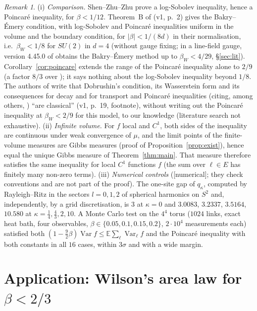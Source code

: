 \documentclass[11pt,a4paper]{article}
\theoremstyle{remark}
\newtheorem{remark}[theorem]{Remark}
\theoremstyle{definition}
\theoremstyle{plain}
\theoremstyle{remark}
\newcommand{\E}{\mathbb{E}}
\newcommand{\Var}{\operatorname{Var}}
\newcommand{\st}[1]{\textsf{[#1]}}
\begin{document}
\begin{remark}\label{rem:poincare}
(i) \emph{Comparison.} Shen--Zhu--Zhu \cite{SZZ23} prove a log-Sobolev inequality, hence a Poincar\'e inequality, for $\beta<1/12$. Theorem~B of \cite{BB26} (v1, p.~2) gives the Bakry--\'Emery
condition, with log-Sobolev and Poincar\'e inequalities uniform in the volume and the boundary condition, for $|\beta|<1/(8d)$ in their normalisation, i.e.\ $\beta_W<1/8$ for $SU(2)$ in $d=4$ (without gauge fixing; in a line-field gauge, version 4.45.0 of \cite{BB26e} obtains the Bakry--\'Emery method up to $\beta_W<4/29$, \S\ref{sec:lit}). Corollary~\ref{cor:poincare} extends the range of the
Poincar\'e inequality alone to $2/9$ (a factor $8/3$ over \cite{SZZ23}); it says nothing about the log-Sobolev inequality beyond $1/8$. The authors of \cite{BB26} write that Dobrushin's condition,
its Wasserstein form and its consequences for decay and for transport and Poincar\'e inequalities (citing, among others, \cite{Wu06}) ``are classical'' (v1, p.~19, footnote), without writing out the Poincar\'e inequality at $\beta_W<2/9$ for this model, to our
knowledge (literature search not exhaustive).
(ii) \emph{Infinite volume.} For $f$ local and $C^1$, both sides of the inequality are continuous under weak convergence of $\mu$, and the limit points of the finite-volume measures are Gibbs measures (proof of
Proposition~\ref{prop:exist}), hence equal the unique Gibbs measure of Theorem~\ref{thm:main}. That measure therefore satisfies the same inequality for local $C^1$ functions $f$ (the sum over $\ell\in E$ has finitely many non-zero terms).
(iii) \emph{Numerical controls} (\st{numerical}; they check conventions and are not part of the proof). The one-site gap of $q_\kappa$, computed by Rayleigh--Ritz in the sectors $l=0,1,2$ of spherical harmonics on $S^2$ and, independently, by a grid discretisation,
is $3$ at $\kappa=0$ and $3.0083$, $3.2337$, $3.5164$, $10.580$ at $\kappa=\frac14,\frac43,2,10$. A Monte Carlo test on the $4^4$ torus ($1024$ links, exact heat bath, four observables, $\beta\in\{0.05,0.1,0.15,0.2\}$, $2\cdot10^4$ measurements each)
satisfied both $(1-\frac92\beta)\Var f\le\E\sum_\ell\Var_\ell f$ and the Poincar\'e inequality with both constants in all $16$ cases, within $3\sigma$ and with a wide margin.
\end{remark}

\section{Application: Wilson's area law for $\beta<2/3$}\label{sec:area}
\end{document}
